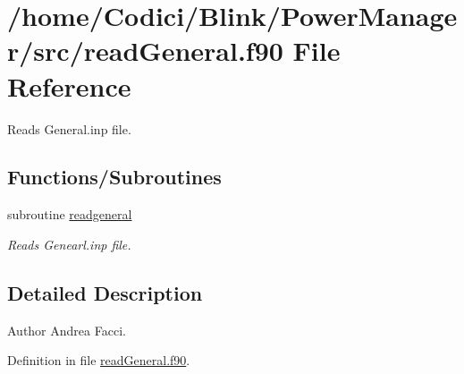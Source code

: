 \hypertarget{read_general_8f90}{\section{/home/\-Codici/\-Blink/\-Power\-Manager/src/read\-General.f90 File Reference}
\label{read_general_8f90}
}


Reads General.\-inp file.  


\subsection*{Functions/\-Subroutines}
\begin{DoxyCompactItemize}
\item 
subroutine \hyperlink{read_general_8f90_a7f63c840fdfc061f2289fb0106adc2d0}{readgeneral}
\begin{DoxyCompactList}\small\item\em Reads Genearl.\-inp file. \end{DoxyCompactList}\end{DoxyCompactItemize}


\subsection{Detailed Description}
\begin{DoxyAuthor}{Author}
Andrea Facci. 
\end{DoxyAuthor}


Definition in file \hyperlink{read_general_8f90_source}{read\-General.\-f90}.



